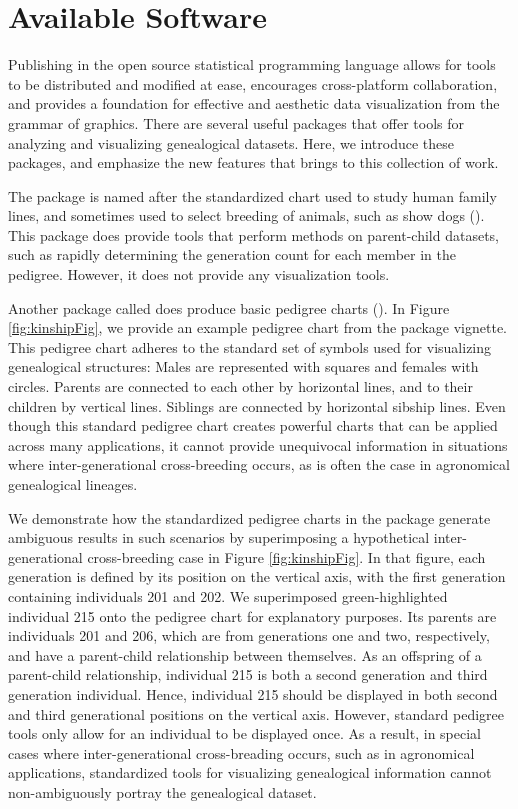\documentclass[article,shortnames]{jss}
\begin{document}
\section{Available Software}

Publishing in the open source  statistical programming language allows for tools to be distributed and modified at ease, encourages cross-platform collaboration, and provides a foundation for effective and aesthetic data visualization from the grammar of graphics. There are several useful  packages that offer tools for analyzing and visualizing genealogical datasets. Here, we introduce these packages, and emphasize the new features that  brings to this collection of work.

The  package  is named after the standardized chart used to study human family lines, and sometimes used to select breeding of animals, such as show dogs (\citealt{ped}). This package does provide tools that perform methods on parent-child datasets, such as rapidly determining the generation count for each member in the pedigree. However, it does not provide any visualization tools.

Another  package called  does produce basic pedigree charts (\citealt{kin}). In Figure \ref{fig:kinshipFig}, we provide an example pedigree chart from the  package vignette. This pedigree chart adheres to the standard set of symbols used for visualizing genealogical structures: Males are represented with squares and females with circles. Parents are connected to each other by horizontal lines, and to their children by vertical lines. Siblings are connected by horizontal sibship lines. Even though this standard pedigree chart creates powerful charts that can be applied across many applications, it cannot provide unequivocal information in situations where inter-generational cross-breeding occurs, as is often the case in agronomical genealogical lineages.

We demonstrate how the standardized pedigree charts in the  package generate ambiguous results in such scenarios by superimposing a hypothetical inter-generational cross-breeding case in Figure \ref{fig:kinshipFig}. In that figure, each generation is defined by its position on the vertical axis, with the first generation containing individuals 201 and 202. We superimposed green-highlighted individual 215 onto the pedigree chart for explanatory purposes. Its parents are individuals 201 and 206, which are from generations one and two, respectively, and have a parent-child relationship between themselves. As an offspring of a parent-child relationship, individual 215 is both a second generation and third generation individual. Hence, individual 215 should be displayed in both second and third generational positions on the vertical axis. However, standard pedigree tools only allow for an individual to be displayed once. As a result, in special cases where inter-generational cross-breading occurs, such as in agronomical applications, standardized tools for visualizing genealogical information cannot non-ambiguously portray the genealogical dataset.
\end{document}
